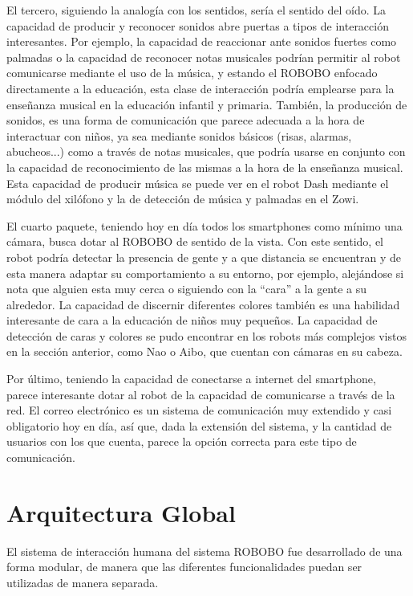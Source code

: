  El tercero, siguiendo la analogía con los sentidos, sería el sentido del oído. La capacidad de producir y reconocer sonidos abre puertas a tipos de interacción interesantes. Por ejemplo, la capacidad de reaccionar ante sonidos fuertes como palmadas o la capacidad de reconocer notas musicales podrían permitir al robot comunicarse mediante el uso de la música, y estando el ROBOBO enfocado directamente a la educación, esta clase de interacción podría emplearse para la enseñanza musical en la educación infantil y primaria. También, la producción de sonidos, es una forma de comunicación que parece adecuada a la hora de interactuar con niños, ya sea mediante sonidos básicos (risas, alarmas, abucheos...)  como a través de notas musicales, que podría usarse en conjunto con la capacidad de reconocimiento de las mismas a la hora de la enseñanza musical. Esta capacidad de producir música se puede ver en el robot Dash mediante el módulo del xilófono y la de detección de música y palmadas en el Zowi.
 
 El cuarto paquete, teniendo hoy en día todos los smartphones como mínimo una cámara, busca dotar al ROBOBO de sentido de la vista. Con este sentido, el robot podría detectar la presencia de gente y a que distancia se encuentran y de esta manera adaptar su comportamiento a su entorno, por ejemplo, alejándose si nota que alguien esta muy cerca o siguiendo con la \enquote{cara} a la gente a su alrededor. La capacidad de discernir diferentes colores también es una habilidad interesante de cara a la educación de niños muy pequeños. La capacidad de detección de caras y colores se pudo encontrar en los robots más complejos vistos en la sección anterior, como Nao o Aibo, que cuentan con cámaras en su cabeza.
 
 Por último, teniendo la capacidad de conectarse a internet del smartphone, parece interesante dotar al robot de la capacidad de comunicarse a través de la red. El correo electrónico es un sistema de comunicación muy extendido y casi obligatorio hoy en día, así que, dada la extensión del sistema, y la cantidad de usuarios con los que cuenta, parece la opción correcta para este tipo de comunicación.
 

\section{Arquitectura Global}
\label{sec:globalArchitecture}
El sistema de interacción humana del sistema ROBOBO fue desarrollado de una forma modular, de manera que las diferentes funcionalidades puedan ser utilizadas de manera separada.

